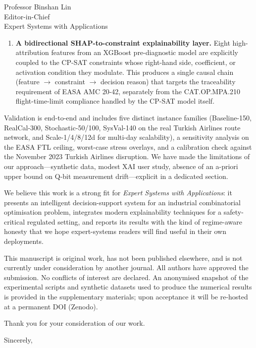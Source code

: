 \documentclass[12pt]{letter}
\begin{document}
\begin{letter}{Professor Binshan Lin \\ Editor-in-Chief \\ Expert Systems with Applications}
\begin{enumerate}
    \item \textbf{A bidirectional SHAP-to-constraint explainability layer.} Eight high-attribution features from an XGBoost pre-diagnostic model are explicitly coupled to the CP-SAT constraints whose right-hand side, coefficient, or activation condition they modulate. This produces a single causal chain (feature $\rightarrow$ constraint $\rightarrow$ decision reason) that targets the traceability requirement of EASA AMC 20-42, separately from the CAT.OP.MPA.210 flight-time-limit compliance handled by the CP-SAT model itself.
\end{enumerate}

Validation is end-to-end and includes five distinct instance families (Baseline-150, RealCal-300, Stochastic-50/100, SysVal-140 on the real Turkish Airlines route network, and Scale-1/4/8/12d for multi-day scalability), a sensitivity analysis on the EASA FTL ceiling, worst-case stress overlays, and a calibration check against the November 2023 Turkish Airlines disruption. We have made the limitations of our approach---synthetic data, modest XAI user study, absence of an a-priori upper bound on Q-bit measurement drift---explicit in a dedicated section.

We believe this work is a strong fit for \textit{Expert Systems with Applications}: it presents an intelligent decision-support system for an industrial combinatorial optimisation problem, integrates modern explainability techniques for a safety-critical regulated setting, and reports its results with the kind of regime-aware honesty that we hope expert-systems readers will find useful in their own deployments.

This manuscript is original work, has not been published elsewhere, and is not currently under consideration by another journal. All authors have approved the submission. No conflicts of interest are declared. An anonymised snapshot of the experimental scripts and synthetic datasets used to produce the numerical results is provided in the supplementary materials; upon acceptance it will be re-hosted at a permanent DOI (Zenodo).

Thank you for your consideration of our work.

\closing{Sincerely,}

\end{letter}
\end{document}
